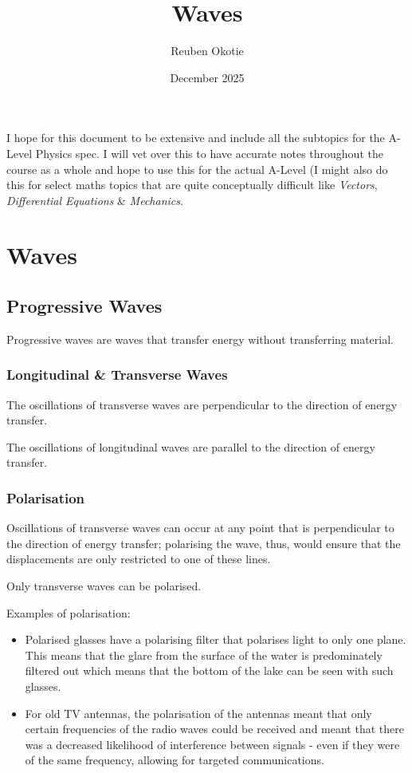 \documentclass{article}
\title{Waves}
\author{Reuben Okotie}
\date{December 2025}
\begin{document}
\maketitle
I hope for this document to be extensive and include all the subtopics for the A-Level Physics spec. I will vet over this to have accurate notes throughout the course as a whole and hope to use this for the actual A-Level (I might also do this for select maths topics that are quite conceptually difficult like \textit{Vectors}, \textit{Differential Equations} \& \textit{Mechanics}.


\section{Waves}

\subsection{Progressive Waves}
Progressive waves are waves that transfer energy without transferring material.

\subsubsection{Longitudinal \& Transverse Waves}
The oscillations of transverse waves are perpendicular to the direction of energy transfer. 

The oscillations of longitudinal waves are parallel to the direction of energy transfer. 

\subsubsection{Polarisation}
Oscillations of transverse waves can occur at any point that is perpendicular to the direction of energy transfer; polarising the wave, thus, would ensure that the displacements are only restricted to one of these lines. 

Only transverse waves can be polarised.

Examples of polarisation: 
\begin{itemize}
    \item Polarised glasses have a polarising filter that polarises light to only one plane. This means that the glare from the surface of the water is predominately filtered out which means that the bottom of the lake can be seen with such glasses. 

    \item For old TV antennas, the polarisation of the antennas meant that only certain frequencies of the radio waves could be received and meant that there was a decreased likelihood of interference between signals - even if they were of the same frequency, allowing for targeted communications.
\end{itemize}
\end{document}
